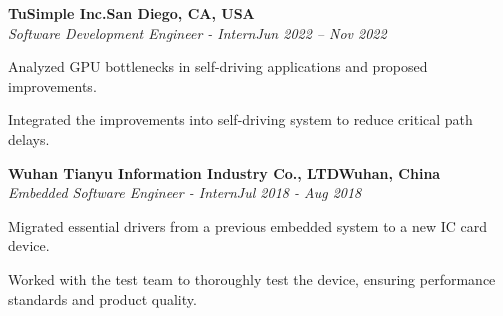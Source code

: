 \documentclass[letterpaper,10pt]{article}
\newcommand{\heading}[2]{
  \hspace{10pt}#1\hfill#2\\
}
\newcommand{\headingBf}[2]{
  \heading{\textbf{#1}}{\textbf{#2}}
}
\newcommand{\headingIt}[2]{
  \heading{\textit{#1}}{\textit{#2}}
}
\newenvironment{resume_list}{
  \vspace{-7pt}
  \begin{itemize}[itemsep=-2px, parsep=1pt, leftmargin=30pt]
}{
  \end{itemize}
}
\begin{document}
  \headingBf{TuSimple Inc.}{San Diego, CA, USA} %
  \headingIt{Software Development Engineer - Intern}{Jun 2022 -- Nov 2022}
    \begin{resume_list}
        \item Analyzed GPU bottlenecks in self-driving applications and proposed improvements.
        \item Integrated the improvements into self-driving system to reduce critical path delays.
    \end{resume_list}

  \headingBf{Wuhan Tianyu Information Industry Co., LTD}{Wuhan, China}
  \headingIt{Embedded Software Engineer - Intern}{Jul 2018 - Aug 2018}
  \begin{resume_list}
      \item Migrated essential drivers from a previous embedded system to a new IC card device.
      \item Worked with the test team to thoroughly test the device, ensuring performance standards and product quality.
  \end{resume_list}
\end{document}

